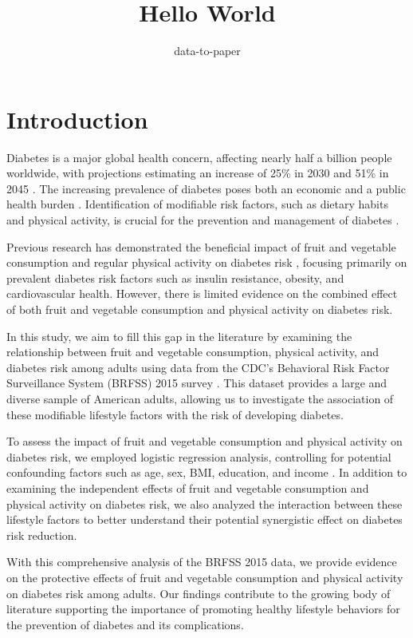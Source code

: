 \documentclass[12pt]{article}
\title{Hello World}
\author{data-to-paper}
\begin{document}
\maketitle

\section{Introduction}

Diabetes is a major global health concern, affecting nearly half a billion people worldwide, with projections estimating an increase of 25\% in 2030 and 51\% in 2045 \cite{Saeedi2019GlobalAR}. The increasing prevalence of diabetes poses both an economic and a public health burden \cite{Wild2004GlobalPO}. Identification of modifiable risk factors, such as dietary habits and physical activity, is crucial for the prevention and management of diabetes \cite{Uloko2018PrevalenceAR}.

Previous research has demonstrated the beneficial impact of fruit and vegetable consumption and regular physical activity on diabetes risk \cite{Li2016AssociationBA, Herbst2007ImpactOP}, focusing primarily on prevalent diabetes risk factors such as insulin resistance, obesity, and cardiovascular health. However, there is limited evidence on the combined effect of both fruit and vegetable consumption and physical activity on diabetes risk.

In this study, we aim to fill this gap in the literature by examining the relationship between fruit and vegetable consumption, physical activity, and diabetes risk among adults using data from the CDC's Behavioral Risk Factor Surveillance System (BRFSS) 2015 survey \cite{Flores-Hernndez2015QualityOD,Iachan2016NationalWO}. This dataset provides a large and diverse sample of American adults, allowing us to investigate the association of these modifiable lifestyle factors with the risk of developing diabetes.

To assess the impact of fruit and vegetable consumption and physical activity on diabetes risk, we employed logistic regression analysis, controlling for potential confounding factors such as age, sex, BMI, education, and income \cite{Gomes-Neto2019FruitAV}. In addition to examining the independent effects of fruit and vegetable consumption and physical activity on diabetes risk, we also analyzed the interaction between these lifestyle factors to better understand their potential synergistic effect on diabetes risk reduction.

With this comprehensive analysis of the BRFSS 2015 data, we provide evidence on the protective effects of fruit and vegetable consumption and physical activity on diabetes risk among adults. Our findings contribute to the growing body of literature supporting the importance of promoting healthy lifestyle behaviors for the prevention of diabetes and its complications.
\end{document}
